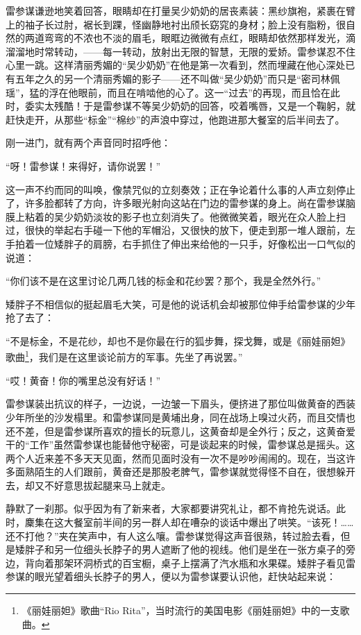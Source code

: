 \par 雷参谋谦逊地笑着回答，眼睛却在打量吴少奶奶的居丧素装：黑纱旗袍，紧裹在臂上的袖子长过肘，裾长到踝，怪幽静地衬出颀长窈窕的身材；脸上没有脂粉，很自然的两道弯弯的不浓也不淡的眉毛，眼眶边微微有点红，眼睛却依然那样发光，滴溜溜地时常转动，——每一转动，放射出无限的智慧，无限的爱娇。雷参谋忍不住心里一跳。这样清丽秀媚的“吴少奶奶”在他是第一次看到，然而埋藏在他心深处已有五年之久的另一个清丽秀媚的影子——还不叫做“吴少奶奶”而只是“密司林佩瑶”，猛的浮在他眼前，而且在啃啮他的心了。这一“过去”的再现，而且恰在此时，委实太残酷！于是雷参谋不等吴少奶奶的回答，咬着嘴唇，又是一个鞠躬，就赶快走开，从那些“标金”“棉纱”的声浪中穿过，他跑进那大餐室的后半间去了。
\par 刚一进门，就有两个声音同时招呼他：
\par “呀！雷参谋！来得好，请你说罢！”
\par 这一声不约而同的叫唤，像禁咒似的立刻奏效；正在争论着什么事的人声立刻停止了，许多脸都转了方向，许多眼光射向这站在门边的雷参谋的身上。尚在雷参谋脑膜上粘着的吴少奶奶淡妆的影子也立刻消失了。他微微笑着，眼光在众人脸上扫过，很快的举起右手碰一下他的军帽沿，又很快的放下，便走到那一堆人跟前，左手拍着一位矮胖子的肩膀，右手抓住了伸出来给他的一只手，好像松出一口气似的说道：
\par “你们该不是在这里讨论几两几钱的标金和花纱罢？那个，我是全然外行。”
\par 矮胖子不相信似的挺起眉毛大笑，可是他的说话机会却被那位伸手给雷参谋的少年抢了去了：
\par “不是标金，不是花纱，却也不是你最在行的狐步舞，探戈舞，或是《丽娃丽妲》歌曲\footnote{《丽娃丽妲》歌曲“Rio Rita”，当时流行的美国电影《丽娃丽妲》中的一支歌曲。}，我们是在这里谈论前方的军事。先坐了再说罢。”
\par “哎！黄奋！你的嘴里总没有好话！”
\par 雷参谋装出抗议的样子，一边说，一边皱一下眉头，便挤进了那位叫做黄奋的西装少年所坐的沙发榻里。和雷参谋同是黄埔出身，同在战场上嗅过火药，而且交情也还不差，但是雷参谋所喜欢的擅长的玩意儿，这黄奋却是全外行；反之，这黄奋爱干的“工作”虽然雷参谋也能替他守秘密，可是谈起来的时候，雷参谋总是摇头。这两个人近来差不多天天见面，然而见面时没有一次不是吵吵闹闹的。现在，当这许多面熟陌生的人们跟前，黄奋还是那股老脾气，雷参谋就觉得怪不自在，很想躲开去，却又不好意思拔起腿来马上就走。
\par 静默了一刹那。似乎因为有了新来者，大家都要讲究礼让，都不肯抢先说话。此时，麇集在这大餐室前半间的另一群人却在嘈杂的谈话中爆出了哄笑。“该死！……还不打他？”夹在笑声中，有人这么嚷。雷参谋觉得这声音很熟，转过脸去看，但是矮胖子和另一位细头长脖子的男人遮断了他的视线。他们是坐在一张方桌子的旁边，背向着那架环洞桥式的百宝橱，桌子上摆满了汽水瓶和水果碟。矮胖子看见雷参谋的眼光望着细头长脖子的男人，便以为雷参谋要认识他，赶快站起来说：
